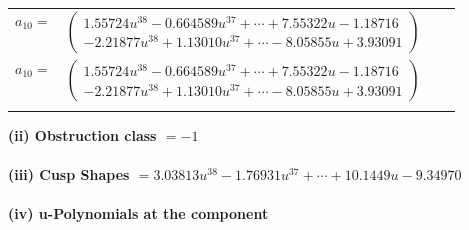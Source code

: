 \documentclass[1p]{elsarticle_modified}
\theoremstyle{definition}
\begin{document}
\begin{tabular}{m{7pt} m{180pt} m{7pt} m{180pt} }
\flushright $a_{10}=$&$\begin{pmatrix}1.55724 u^{38}-0.664589 u^{37}+\cdots+7.55322 u-1.18716\\-2.21877 u^{38}+1.13010 u^{37}+\cdots-8.05855 u+3.93091\end{pmatrix}$\\ \flushright $a_{10}=$&$\begin{pmatrix}1.55724 u^{38}-0.664589 u^{37}+\cdots+7.55322 u-1.18716\\-2.21877 u^{38}+1.13010 u^{37}+\cdots-8.05855 u+3.93091\end{pmatrix}$\\&\end{tabular}
\flushleft \textbf{(ii) Obstruction class $= -1$}\\~\\
\flushleft \textbf{(iii) Cusp Shapes $= 3.03813 u^{38}-1.76931 u^{37}+\cdots+10.1449 u-9.34970$}\\~\\
\newpage\renewcommand{\arraystretch}{1}
\flushleft \textbf{(iv) u-Polynomials at the component}\newline \\
\end{document}

